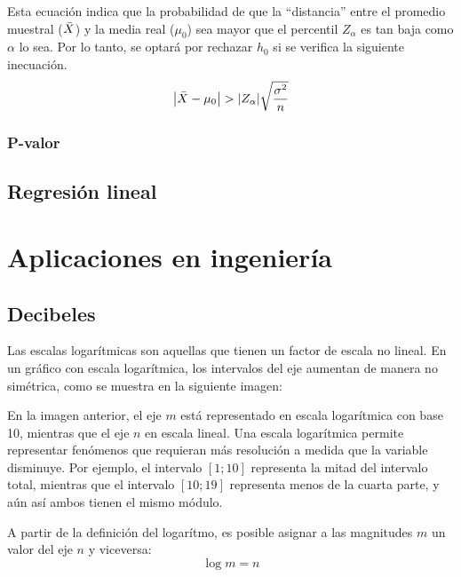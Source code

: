 \documentclass[a5paper,12pt,twoside]{book}
\begin{document}
Esta ecuación indica que la probabilidad de que la ``distancia'' entre el promedio muestral ($\bar{X}$) y la media real ($\mu_0$) sea mayor que el percentil $Z_\alpha$ es tan baja como $\alpha$ lo sea.
Por lo tanto, se optará por rechazar $h_0$ si se verifica la siguiente inecuación.
\begin{equation*}
    {\left| {\bar{X}-\mu_0} \right|} > {\left| {Z_\alpha} \right|} \sqrt{\dfrac{\sigma^2}{n}}
\end{equation*}


\subsection{P-valor}


\section{Regresión lineal}



\appendix


\chapter{Aplicaciones en ingeniería}


\section{Decibeles}

Las escalas logarítmicas son aquellas que tienen un factor de escala no lineal. En un gráfico con escala logarítmica, los intervalos del eje aumentan de manera no simétrica, como se muestra en la siguiente imagen:

\begin{center}
    \def\svgwidth{\linewidth}
    
\end{center}

En la imagen anterior, el eje $m$ está representado en escala logarítmica con base 10, mientras que el eje $n$ en escala lineal. Una escala logarítmica permite representar fenómenos que requieran más resolución a medida que la variable disminuye. Por ejemplo, el intervalo $[1;10]$ representa la mitad del intervalo total, mientras que el intervalo $[10;19]$ representa menos de la cuarta parte, y aún así ambos tienen el mismo módulo.

A partir de la definición del logarítmo, es posible asignar a las magnitudes $m$ un valor del eje $n$ y viceversa:
\begin{equation*}
    \log{m}=n
\end{equation*}
\end{document}
